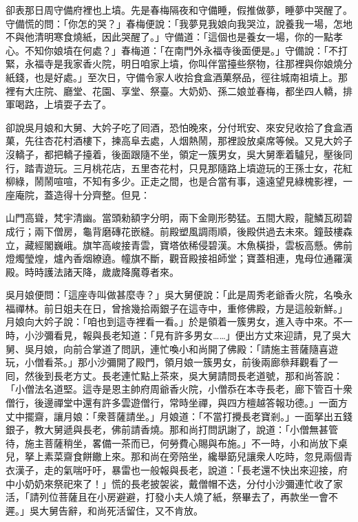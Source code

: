 卻表那日周守備府裡也上墳。先是春梅隔夜和守備睡，假推做夢，睡夢中哭醒了。{}守備慌的問：「你怎的哭？」春梅便說：「我夢見我娘向我哭泣，說養我一場，怎地不與他清明寒食燒紙，因此哭醒了。」守備道：「這個也是養女一場，你的一點孝心。不知你娘墳在何處？」春梅道：「在南門外永福寺後面便是。」守備說：「不打緊，永福寺是我家香火院，明日咱家上墳，你叫伴當擡些祭物，往那裡與你娘燒分紙錢，也是好處。」至次日，守備令家人收拾食盒酒菓祭品，徑往城南祖墳上。那裡有大庄院、廳堂、花園、享堂、祭臺。大奶奶、孫二娘並春梅，都坐四人轎，排軍喝路，上墳耍子去了。

卻說吳月娘和大舅、大妗子吃了囘酒，恐怕晚來，分付玳安、來安兒收拾了食盒酒菓，先往杏花村酒樓下，揀高阜去處，人烟熱鬧，那裡設放桌席等候。又見大妗子沒轎子，都把轎子擡着，後面跟隨不坐，領定一簇男女，吳大舅牽着驢兒，壓後同行，踏青遊玩。三月桃花店，五里杏花村，只見那隨路上墳遊玩的王孫士女，花紅柳綠，鬧鬧喧喧，不知有多少。正走之間，也是合當有事，遠遠望見綠槐影裡，一座庵院，蓋造得十分齊整。但見：

\begin{myquote}
山門高聳，梵宇清幽。當頭勑額字分明，兩下金剛形勢猛。五間大殿，龍鱗瓦砌碧成行；兩下僧房，龜背磨磚花嵌縫。前殿塑風調雨順，後殿供過去未來。鐘鼓樓森立，藏經閣巍峨。旗竿高峻接青雲，寶塔依稀侵碧漢。木魚橫掛，雲板高懸。佛前燈燭瑩煌，爐內香烟繚遶。幢旗不斷，觀音殿接祖師堂；寶蓋相連，鬼母位通羅漢殿。時時護法諸天降，歲歲降魔尊者來。
\end{myquote}

吳月娘便問：「這座寺叫做甚麼寺？」吳大舅便說：「此是周秀老爺香火院，名喚永福禪林。前日姐夫在日，曾捨幾拾兩銀子在這寺中，重修佛殿，方是這般新鮮。」月娘向大妗子說：「咱也到這寺裡看一看。」於是領着一簇男女，進入寺中來。不一時，小沙彌看見，報與長老知道：「見有許多男女……」便出方丈來迎請，見了吳大舅、吳月娘，向前合掌道了問訊，連忙喚小和尚開了佛殿：「請施主菩薩隨喜遊玩，小僧看茶。」那小沙彌開了殿門，領月娘一簇男女，前後兩廊叅拜觀看了一囘，然後到長老方丈。長老連忙點上茶來，吳大舅請問長老道號，那和尚答說：「小僧法名道堅。這寺是恩主帥府周爺香火院，小僧忝在本寺長老，廊下管百十衆僧行，後邊禪堂中還有許多雲遊僧行，常時坐禪，{}與四方檀越答報功德。」一面方丈中擺齋，讓月娘：「衆菩薩請坐。」月娘道：「不當打攪長老寶剎。」一面拏出五錢銀子，教大舅遞與長老，佛前請香燒。那和尚打問訊謝了，說道：「小僧無甚管待，施主菩薩稍坐，畧備一茶而已，何勞費心賜與布施。」不一時，小和尚放下桌兒，拏上素菜齋食餅饊上來。那和尚在旁陪坐，纔舉筯兒讓衆人吃時，忽見兩個青衣漢子，走的氣喘吁吁，暴雷也一般報與長老，說道：「長老還不快出來迎接，府中小奶奶來祭祀來了！」慌的長老披袈裟，戴僧帽不迭，分付小沙彌連忙收了家活，「請列位菩薩且在小房避避，打發小夫人燒了紙，祭畢去了，再款坐一會不遲。」吳大舅告辭，和尚死活留住，又不肯放。


